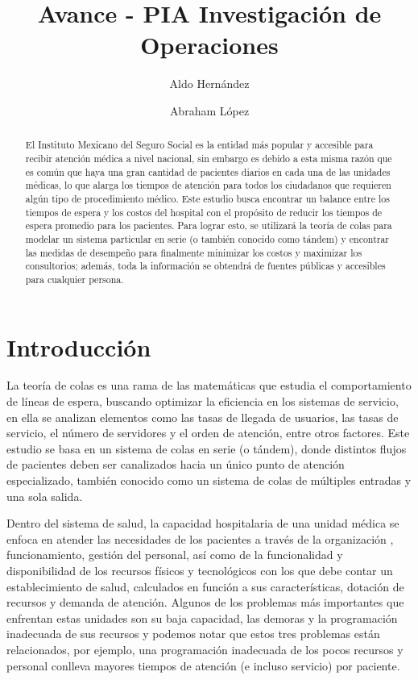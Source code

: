 \documentclass[10pt]{article}
\begin{document}
	\begin{opening}
		\title{Avance - PIA Investigación de Operaciones}
		\author[Universidad Autónoma de Nuevo León, San Nicolás de los Garza, aldo.hernandezt@uanl.edu.mx]{Aldo Hernández}
		\author[Universidad Autónoma de Nuevo León, San Nicolás de los Garza, abraham.lopezg@uanl.edu.mx]{Abraham López}
		
		\begin{abstract}
            El Instituto Mexicano del Seguro Social es la entidad más popular y accesible para recibir atención médica a nivel nacional, sin embargo es debido a esta misma razón que es común que haya una gran cantidad de pacientes diarios en cada una de las unidades médicas, lo que alarga los tiempos de atención para todos los ciudadanos que requieren algún tipo de procedimiento médico. Este estudio busca encontrar un balance entre los tiempos de espera y los costos del hospital con el propósito de reducir los tiempos de espera promedio para los pacientes. Para lograr esto, se utilizará la teoría de colas para modelar un sistema particular en serie (o también conocido como tándem) y encontrar las medidas de desempeño para finalmente minimizar los costos y maximizar los consultorios; además, toda la información se obtendrá de fuentes públicas y accesibles para cualquier persona.
		\end{abstract}

	\end{opening}
	
	\section{Introducción}
	La teoría de colas es una rama de las matemáticas que estudia el comportamiento de líneas de espera, buscando optimizar la eficiencia en los sistemas de servicio, en ella se analizan elementos como las tasas de llegada de usuarios, las tasas de servicio, el número de servidores y el orden de atención, entre otros factores. Este estudio se basa en un sistema de colas en serie (o tándem), donde distintos flujos de pacientes deben ser canalizados hacia un único punto de atención especializado, también conocido como un sistema de colas de múltiples entradas y una sola salida.
	
    Dentro del sistema de salud, la capacidad hospitalaria de una unidad médica se enfoca en atender las necesidades de los pacientes a través de la organización \cite{MEDESK}, funcionamiento, gestión del personal, así como de la funcionalidad y disponibilidad de los recursos físicos y tecnológicos con los que debe contar un establecimiento de salud, calculados en función a sus características, dotación de recursos y demanda de atención. Algunos de los problemas más importantes que enfrentan estas unidades son su baja capacidad, las demoras y la programación inadecuada de sus recursos \cite{MEDESK} y podemos notar que estos tres problemas están relacionados, por ejemplo, una programación inadecuada de los pocos recursos y personal conlleva mayores tiempos de atención (e incluso servicio) por paciente.
    
\end{document}
